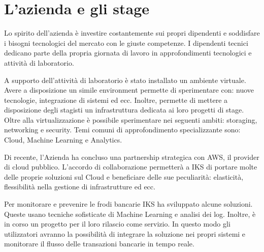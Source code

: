 
\chapter{L'azienda e gli stage}
\label{cap:stage}


\vspace{20pt}
Lo spirito dell'azienda è investire costantemente sui propri dipendenti e 
soddisfare i bisogni tecnologici del mercato con le giuste competenze. 
I dipendenti tecnici dedicano parte della propria giornata di lavoro in 
approfondimenti tecnologici e attività di laboratorio. 

A supporto dell'attività di laboratorio è stato installato un ambiente virtuale. 
Avere a disposizione un simile environment permette di sperimentare con: nuove 
tecnologie, integrazione di sistemi ed ecc. Inoltre, permette di mettere a 
disposizione degli stagisti un infrastruttura dedicata ai loro progetti di 
stage. Oltre alla virtualizzazione è possibile sperimentare nei 
seguenti ambiti: storaging, networking e security. Temi comuni 
di approfondimento specializzante sono: Cloud, Machine Learning e Analytics. 

Di recente, l'Azienda ha concluso una partnership strategica con AWS, il provider
di cloud pubblico. L'accordo di collaborazione permetterà a IKS di portare 
molte delle proprie soluzioni sul Cloud e beneficiare delle sue 
peculiarità: elasticità, flessibilità nella gestione di infrastrutture ed ecc. 

Per monitorare e prevenire le frodi bancarie IKS ha sviluppato alcune soluzioni. 
Queste usano tecniche sofisticate di Machine Learning e analisi dei log. 
Inoltre, è in corso un progetto per il loro rilascio come servizio. 
In questo modo gli utilizzatori avranno la possibilità di integrare la soluzione 
nei propri sistemi e monitorare il flusso delle transazioni bancarie in tempo
reale.  

